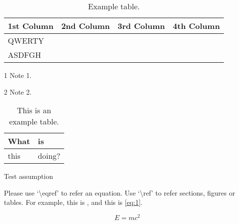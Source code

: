 \begin{tempsection}
    \begin{table}[htbp]
        \begin{center}
        \begin{threeparttable}
        \caption{Example table.\label{tab}}
        \centering
            \begin{tabular}{l c c c}
                \toprule
                    \textbf{1st Column} & \textbf{2nd Column} & \textbf{3rd Column} & \textbf{4th Column} \\ 
                \midrule
                    QWERTY\tnote{1}   &                     &                     &  \\
                    ASDFGH\tnote{2}   &                     &                     &  \\ 
                \bottomrule
            \end{tabular}
            \begin{tablenotes}
                \item [1] Note 1. 
                \item [2] Note 2.
            \end{tablenotes}
        \end{threeparttable}
    \end{center}
    \end{table}

    \begingroup
    \begin{table}
        \centering
        \caption{This is an example table.}\label{tbl:nicetablelesstable}
        \begin{tabular}{ll}
            What & is     \\
            \hline
            this & doing? \\
        \end{tabular}
    \end{table}
    \endgroup

    \begin{assumption}
        Test assumption
    \end{assumption}

    Please use `\textbackslash eqref' to refer an equation. Use `\textbackslash ref' to refer sections, figures or tables. For example, this is , and this is \eqref{eq:1}.

    \begin{equation}
        E = mc^2
        \label{eq:1}
    \end{equation}

\end{tempsection}